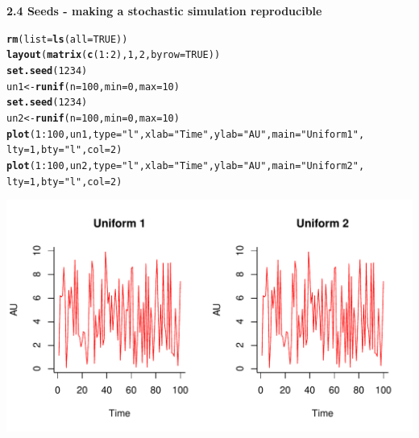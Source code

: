 \documentclass{article}\usepackage[]{graphicx}\usepackage[]{color}
\makeatletter
\newcommand{\hlnum}[1]{\textcolor[rgb]{0.686,0.059,0.569}{#1}}%
\newcommand{\hlstr}[1]{\textcolor[rgb]{0.192,0.494,0.8}{#1}}%
\newcommand{\hlopt}[1]{\textcolor[rgb]{0,0,0}{#1}}%
\newcommand{\hlstd}[1]{\textcolor[rgb]{0.345,0.345,0.345}{#1}}%
\newcommand{\hlkwb}[1]{\textcolor[rgb]{0.69,0.353,0.396}{#1}}%
\newcommand{\hlkwc}[1]{\textcolor[rgb]{0.333,0.667,0.333}{#1}}%
\newcommand{\hlkwd}[1]{\textcolor[rgb]{0.737,0.353,0.396}{\textbf{#1}}}%
\newenvironment{kframe}{%
 \def\at@end@of@kframe{}%
 \ifinner\ifhmode%
  \def\at@end@of@kframe{\end{minipage}}%
  \begin{minipage}{\columnwidth}%
 \fi\fi%
 \def\FrameCommand##1{\hskip\@totalleftmargin \hskip-\fboxsep
 \colorbox{shadecolor}{##1}\hskip-\fboxsep
     \hskip-\linewidth \hskip-\@totalleftmargin \hskip\columnwidth}%
 \MakeFramed {\advance\hsize-\width
   \@totalleftmargin\z@ \linewidth\hsize
   \@setminipage}}%
 {\par\unskip\endMakeFramed%
 \at@end@of@kframe}
\newenvironment{knitrout}{}{} %
\makeatother
\begin{document}
\pagebreak
\bf{2.4 Seeds - making a stochastic simulation reproducible}
\begin{knitrout}
\color{fgcolor}\begin{kframe}
\begin{alltt}
\hlkwd{rm}\hlstd{(}\hlkwc{list} \hlstd{=} \hlkwd{ls}\hlstd{(}\hlkwc{all} \hlstd{=} \hlnum{TRUE}\hlstd{))}
\hlkwd{layout}\hlstd{(}\hlkwd{matrix}\hlstd{(}\hlkwd{c}\hlstd{(}\hlnum{1}\hlopt{:}\hlnum{2}\hlstd{),} \hlnum{1}\hlstd{,} \hlnum{2}\hlstd{,} \hlkwc{byrow} \hlstd{=} \hlnum{TRUE}\hlstd{))}
\hlkwd{set.seed}\hlstd{(}\hlnum{1234}\hlstd{)}
\hlstd{un1} \hlkwb{<-} \hlkwd{runif}\hlstd{(}\hlkwc{n} \hlstd{=} \hlnum{100}\hlstd{,} \hlkwc{min} \hlstd{=} \hlnum{0}\hlstd{,} \hlkwc{max} \hlstd{=} \hlnum{10}\hlstd{)}
\hlkwd{set.seed}\hlstd{(}\hlnum{1234}\hlstd{)}
\hlstd{un2} \hlkwb{<-} \hlkwd{runif}\hlstd{(}\hlkwc{n} \hlstd{=} \hlnum{100}\hlstd{,} \hlkwc{min} \hlstd{=} \hlnum{0}\hlstd{,} \hlkwc{max} \hlstd{=} \hlnum{10}\hlstd{)}
\hlkwd{plot}\hlstd{(}\hlnum{1}\hlopt{:}\hlnum{100}\hlstd{, un1,} \hlkwc{type} \hlstd{=} \hlstr{"l"}\hlstd{,} \hlkwc{xlab} \hlstd{=} \hlstr{"Time"}\hlstd{,} \hlkwc{ylab} \hlstd{=} \hlstr{"AU"}\hlstd{,} \hlkwc{main} \hlstd{=} \hlstr{"Uniform 1"}\hlstd{,}
    \hlkwc{lty} \hlstd{=} \hlnum{1}\hlstd{,} \hlkwc{bty} \hlstd{=} \hlstr{"l"}\hlstd{,} \hlkwc{col} \hlstd{=} \hlnum{2}\hlstd{)}
\hlkwd{plot}\hlstd{(}\hlnum{1}\hlopt{:}\hlnum{100}\hlstd{, un2,} \hlkwc{type} \hlstd{=} \hlstr{"l"}\hlstd{,} \hlkwc{xlab} \hlstd{=} \hlstr{"Time"}\hlstd{,} \hlkwc{ylab} \hlstd{=} \hlstr{"AU"}\hlstd{,} \hlkwc{main} \hlstd{=} \hlstr{"Uniform 2"}\hlstd{,}
    \hlkwc{lty} \hlstd{=} \hlnum{1}\hlstd{,} \hlkwc{bty} \hlstd{=} \hlstr{"l"}\hlstd{,} \hlkwc{col} \hlstd{=} \hlnum{2}\hlstd{)}
\end{alltt}
\end{kframe}
\includegraphics[width=.5\linewidth]{figure/seeds} 

\end{knitrout}
\end{document}
